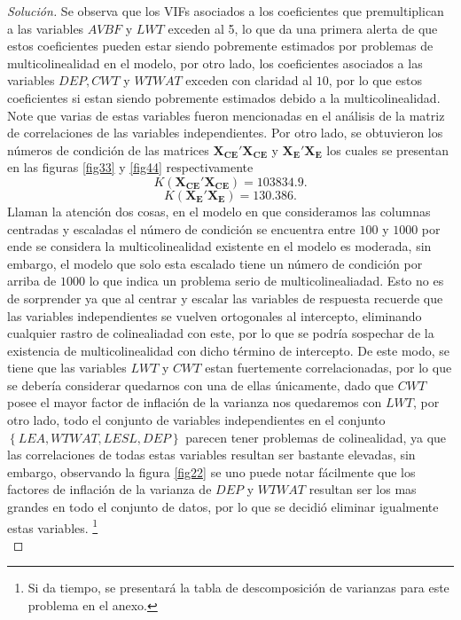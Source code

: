 \documentclass[10.5pt,notitlepage]{article}
\newenvironment{solucion}
  {\begin{proof}[Solución]}
  {\end{proof}}
\newcommand{\kis}[1]{\left\{ #1 \right\}}
\theoremstyle{plain}
\begin{document}
\begin{solucion}
Se observa que los VIFs asociados a los coeficientes que premultiplican a las variables \(AVBF\) y \(LWT\) exceden al 5, lo que da una primera alerta de que estos coeficientes pueden estar siendo pobremente estimados por problemas de multicolinealidad en el modelo, por otro lado, los coeficientes asociados  a las variables \(DEP, CWT\) y \(WTWAT\) exceden con claridad al \(10\), por lo que estos coeficientes si estan siendo pobremente estimados debido a la multicolinealidad. Note que varias de estas variables fueron mencionadas en el análisis de la matriz de correlaciones de las variables independientes. Por otro lado, se obtuvieron los números de condición de las matrices \(\mathbf{X_{CE}}' \mathbf{X_{CE}}\) y \(\mathbf{X_{E}}'\mathbf{X_{E}}\) los cuales se presentan en las figuras \eqref{fig33} y \ref{fig44} respectivamente 
\begin{equation}\label{fig33}
K(\mathbf{X_{CE}}' \mathbf{X_{CE}}) = 103834.9. 
\end{equation}
\begin{equation}\label{fig44}    K(\mathbf{X_{E}}' \mathbf{X_{E}}) =130.386.
\end{equation}
Llaman la atención dos cosas, en el modelo en que consideramos las columnas centradas y escaladas el número de condición se encuentra entre \(100\) y \(1000\) por ende se considera la multicolinealidad existente en el modelo es moderada, sin embargo, el modelo que solo esta escalado tiene un número de condición por arriba de \(1000\) lo que indica un problema serio de multicolinealiadad. Esto no es de sorprender ya que al centrar y escalar las variables de respuesta recuerde que las variables independientes se vuelven ortogonales al intercepto, eliminando cualquier rastro de colinealiadad con este, por lo que se podría sospechar de la existencia de multicolinealidad con dicho término de intercepto. De este modo, se tiene que las variables \(LWT\) y \(CWT\) estan fuertemente correlacionadas, por lo que se debería considerar quedarnos con una de ellas únicamente, dado que \(CWT\) posee el mayor factor de inflación de la varianza nos quedaremos con \(LWT\), por otro lado, todo el conjunto de variables independientes en el conjunto \(\kis{LEA, WTWAT, LESL,DEP}\) parecen tener problemas de colinealidad, ya que las correlaciones de todas estas variables resultan ser bastante elevadas, sin embargo, observando la figura \ref{fig22} se uno puede notar fácilmente que los factores de inflación de la varianza de \(DEP\) y \(WTWAT\) resultan ser los mas grandes en todo el conjunto de datos, por lo que se decidió eliminar igualmente estas variables. \footnote{Si da tiempo, se presentará la tabla de descomposición de varianzas para este problema en el anexo.}\\


\end{solucion}
\end{document}
